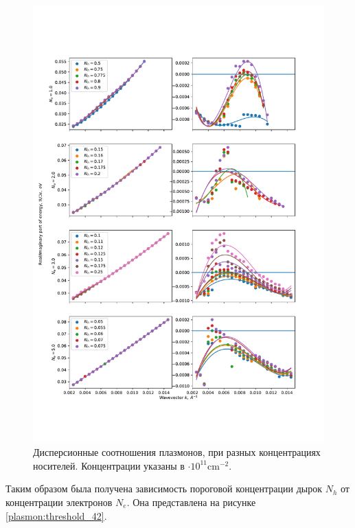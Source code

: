\documentclass[../main.tex]{subfiles}
\begin{document}

    \begin{figure}[h]
        \begin{minipage}[h]{1\textwidth}
            \includegraphics[width=1\textwidth]{./images/compare_plots_6nm_42K.pdf}
            \caption{Дисперсионные соотношения плазмонов, при разных концентрациях 
            носителей. \label{plasmon:compare_42}
            Концентрации указаны в $\cdot 10^{11} \text{cm}^{-2}$.}
        \end{minipage}
    \end{figure}

    Таким образом была получена зависимость пороговой концентрации дырок 
    $N_h$ от концентрации электронов $N_e$. 
    Она представлена на рисунке \ref{plasmon:threshold_42}.
\end{document}
